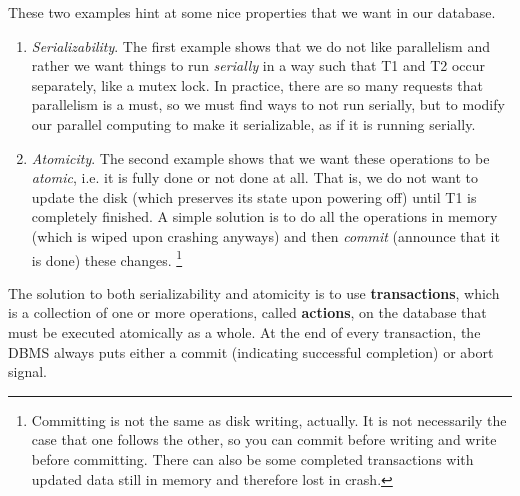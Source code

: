 \documentclass{article}
\begin{document}
    These two examples hint at some nice properties that we want in our database. 
    \begin{enumerate}
      \item \textit{Serializability}. The first example shows that we do not like parallelism and rather we want things to run \textit{serially} in a way such that T1 and T2 occur separately, like a mutex lock. In practice, there are so many requests that parallelism is a must, so we must find ways to not run serially, but to modify our parallel computing to make it serializable, as if it is running serially.  
      \item \textit{Atomicity}. The second example shows that we want these operations to be \textit{atomic}, i.e. it is fully done or not done at all. That is, we do not want to update the disk (which preserves its state upon powering off) until  T1 is completely finished. A simple solution is to do all the operations in memory (which is wiped upon crashing anyways) and then \textit{commit} (announce that it is done) these changes. \footnote{Committing is not the same as disk writing, actually. It is not necessarily the case that one follows the other, so you can commit before writing and write before committing. There can also be some completed transactions with updated data still in memory and therefore lost in crash.} 
    \end{enumerate} 

    \begin{definition}[Transaction]
      The solution to both serializability and atomicity is to use \textbf{transactions}, which is a collection of one or more operations, called \textbf{actions}, on the database that must be executed atomically as a whole. At the end of every transaction, the DBMS always puts either a commit (indicating successful completion) or abort signal. 
    \end{definition} 
\end{document}

